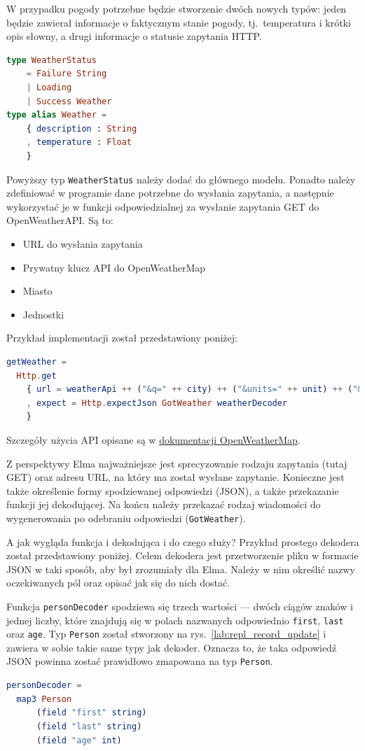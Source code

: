 \documentclass[twoside,a4paper]{report}
\begin{document}
W przypadku pogody potrzebne będzie stworzenie dwóch nowych typów: jeden będzie zawierał informacje o faktycznym stanie pogody, tj.~temperatura i krótki opis słowny, a drugi informacje o statusie zapytania HTTP\@.

\begin{lstlisting}[language=Elm]
type WeatherStatus
    = Failure String
    | Loading
    | Success Weather
type alias Weather =
    { description : String
    , temperature : Float
    }
\end{lstlisting}

Powyższy typ \texttt{WeatherStatus} należy dodać do głównego modelu.
Ponadto należy zdefiniować w programie dane potrzebne do wysłania zapytania, a następnie wykorzystać je w funkcji odpowiedzialnej za wysłanie zapytania GET do OpenWeatherAPI\@.
Są to:
\begin{itemize}[noitemsep,topsep=0pt]
    \item URL do wysłania zapytania
    \item Prywatny klucz API do OpenWeatherMap
    \item Miasto
    \item Jednostki
\end{itemize}
Przykład implementacji został przedstawiony poniżej:

\begin{lstlisting}[language=Elm]
getWeather =
  Http.get
    { url = weatherApi ++ ("&q=" ++ city) ++ ("&units=" ++ unit) ++ ("&appid=" ++ apiKey)
    , expect = Http.expectJson GotWeather weatherDecoder
    }
\end{lstlisting}
Szczegóły użycia API opisane są w \href{https://openweathermap.org/current#name}{dokumentacji OpenWeatherMap}.

Z perspektywy Elma najważniejsze jest sprecyzowanie rodzaju zapytania (tutaj GET) oraz adresu URL, na który ma został wysłane zapytanie.
Konieczne jest także określenie formy spodziewanej odpowiedzi (JSON), a także przekazanie funkcji jej dekodującej.
Na końcu należy przekazać rodzaj wiadomości do wygenerowania po odebraniu odpowiedzi (\texttt{GotWeather}).

A jak wygląda funkcja i dekodująca i do czego służy?
Przykład prostego dekodera został przedstawiony poniżej.
Celem dekodera jest przetworzenie pliku w formacie JSON w taki sposób, aby był zrozumiały dla Elma.
Należy w nim określić nazwy oczekiwanych pól oraz opisać jak się do nich dostać.

Funkcja \texttt{personDecoder} spodziewa się trzech wartości --- dwóch ciągów znaków i jednej liczby, które znajdują się w polach nazwanych odpowiednio \texttt{first}, \texttt{last} oraz \texttt{age}.
Typ \texttt{Person} został stworzony na rys.~\ref{lab:repl_record_update} i zawiera w sobie takie same typy jak dekoder.
Oznacza to, że taka odpowiedź JSON powinna zostać prawidłowo zmapowana na typ \texttt{Person}.
\begin{lstlisting}[language=Elm]
personDecoder =
  map3 Person
      (field "first" string)
      (field "last" string)
      (field "age" int)
\end{lstlisting}
\end{document}
